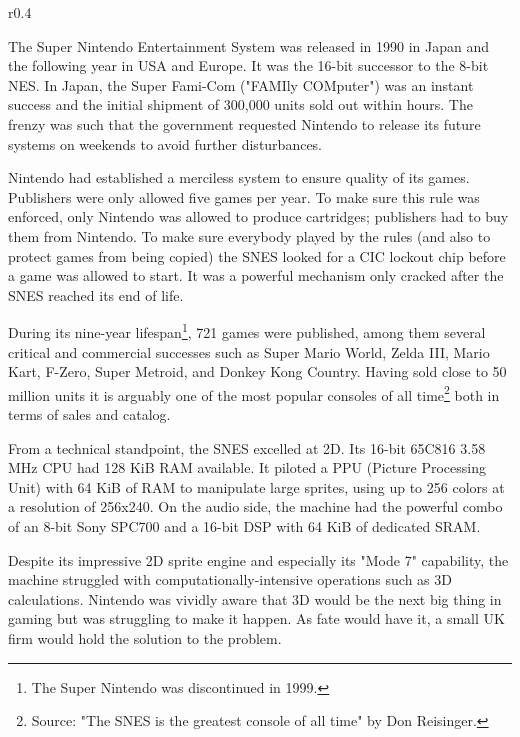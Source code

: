 \begin{wrapfigure}[3]{r}{0.4\textwidth}{
\centering {}}
\end{wrapfigure}
The Super Nintendo Entertainment System was released in 1990 in Japan and the following year in USA and Europe. It was the 16-bit successor to the 8-bit NES. In Japan, the Super Fami-Com ("FAMIly COMputer") was an instant success and the initial shipment of 300,000 units sold out within hours. The frenzy was such that the government requested Nintendo to release its future systems on weekends to avoid further disturbances.\\
\par
Nintendo had established a merciless system to ensure quality of its games. Publishers were only allowed five games per year. To make sure this rule was enforced, only Nintendo was allowed to produce cartridges; publishers had to buy them from Nintendo. To make sure everybody played by the rules (and also to protect games from being copied) the SNES looked for a CIC lockout chip before a game was allowed to start. It was a powerful mechanism only cracked after the SNES reached its end of life.\\
\par
During its nine-year lifespan\footnote{The Super Nintendo was discontinued in 1999.}, 721 games were published, among them several critical and commercial successes such as Super Mario World, Zelda III, Mario Kart, F-Zero, Super Metroid, and Donkey Kong Country. Having sold close to 50 million units it is arguably one of the most popular consoles of all time\footnote{Source: "The SNES is the greatest console of all time" by Don Reisinger.} both in terms of sales and catalog.\\
\par
{}
\par
From a technical standpoint, the SNES excelled at 2D. Its 16-bit 65C816 3.58 MHz CPU had 128 KiB RAM available. It piloted a PPU (Picture Processing Unit) with 64 KiB of RAM to manipulate large sprites, using up to 256 colors at a resolution of 256x240. On the audio side, the machine had the powerful combo of an 8-bit Sony SPC700 and a 16-bit DSP with 64 KiB of dedicated SRAM.\\
\par

Despite its impressive 2D sprite engine and especially its "Mode 7" capability, the machine struggled with computationally-intensive operations such as 3D calculations. Nintendo was vividly aware that 3D would be the next big thing in gaming but was struggling to make it happen. As fate would have it, a small UK firm would hold the solution to the problem.\\

